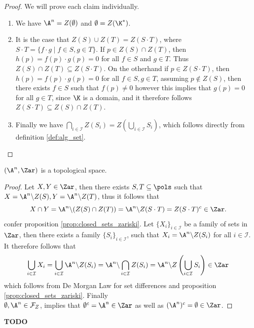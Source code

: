\begin{proof} We will prove each claim individually.
  \begin{enumerate}
      \item We have $\A^{n} = Z(\emptyset)$ and $\emptyset = Z(\K^{*})$.
      \item It is the case that $Z(S) \cup Z(T) = Z(S \cdot T)$, where $S \cdot T = \{f \cdot g \;\vert\; f \in S, g \in T\}$.
        If $p \in Z(S) \cap Z(T)$, then $h(p) = f(p) \cdot g(p) = 0$ for all $f \in S$ and $g \in T$. Thus $Z(S) \cap Z(T) \subseteq Z(S \cdot T)$.
        On the otherhand if $p \in Z(S \cdot T)$, then $h(p) = f(p) \cdot g(p) = 0$ for all $f \in S, g \in T$, assuming $p \not \in Z(S)$, then there exists $f \in S$ such that $f(p) \neq 0$ however this implies that $g(p) = 0$ for all $g \in T$, since $\K$ is a domain, and it therefore follows $Z(S \cdot T) \subseteq Z(S) \cap Z(T)$.
      \item Finally we have $\bigcap_{i \in \mathcal{I}} Z(S_{i}) = Z \left(\bigcup_{i \in \mathcal{I}} S_i\right)$, which follows directly from definition \ref{def:alg_set}. \qedhere
  \end{enumerate}
\end{proof}

\begin{corollary}
  $(\A^{n}, \Zar)$ is a topological space.
\end{corollary}
\begin{proof}
  Let $X, Y \in \Zar$, then there exists $S, T \subseteq \pols$ such that $X = \A^{n} \backslash Z(S), Y = \A^n \backslash Z(T)$, thus it follows that
  \begin{equation*}
    X \cap Y = \A^{n} \backslash (Z(S) \cap Z(T)) = \A^{n} \backslash Z(S \cdot T) = Z(S \cdot T)^{c} \in \Zar.
  \end{equation*}
  confer proposition \ref{prop:closed_sets_zariski}. Let $\{X_{i}\}_{i \in \mathcal{I}}$ be a family of sets in $\Zar$, then there exists a family $\{S_{i}\}_{i \in \mathcal{I}}$, such that $X_{i} = \A^{n} \backslash Z(S_{i})$ for all $i \in \mathcal{I}$. It therefore follows that
  \begin{equation*}
    \bigcup_{i \in \mathcal{I}} X_{i} = \bigcup_{i \in \mathcal{I}} \A^{n} \backslash Z(S_{i}) = \A^{n} \backslash \bigcap_{i \in \mathcal{I}} Z(S_{i}) = \A^{n} \backslash Z\left(\bigcup_{i \in \mathcal{I}} S_{i}\right) \in \Zar
  \end{equation*}
  which follows from De Morgan Law for set differences and proposition \ref{prop:closed_sets_zariski}. Finally \\ $\emptyset, \A^{n} \in \mathcal{F}_{Z}$, implies that $\emptyset^{c} = \A^{n} \in \Zar$ as well as $(\A^{n})^{c} = \emptyset \in \Zar$.
\end{proof}
\begin{example}
  \textbf{TODO}
\end{example}



